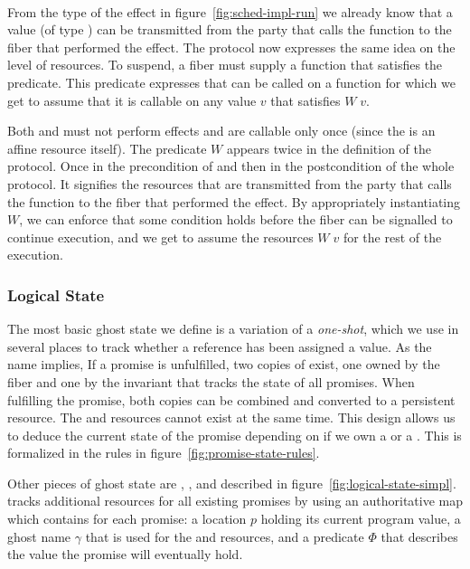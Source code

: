 \paragraph*{\esuspend{}}
From the type of the \esuspend{} effect in figure~\ref{fig:sched-impl-run} we already know that a value (of type ) can be transmitted from the party that calls the  function to the fiber that performed the effect.
The \esuspend{} protocol now expresses the same idea on the level of resources.
To suspend, a fiber must supply a function  that satisfies the \gsIsReg{} predicate.
This predicate expresses that  can be called on a  function for which we get to assume that it is callable on any value \(v\) that satisfies \(W\; v\).

Both  and  must not perform effects and are callable only once (since the \ewpt{} is an affine resource itself).
The predicate \(W\) appears twice in the definition of the protocol.
Once in the precondition of  and then in the postcondition of the whole protocol.
It signifies the resources that are transmitted from the party that calls the  function to the fiber that performed the effect.
By appropriately instantiating \(W\), we can enforce that some condition holds before the fiber can be signalled to continue execution, and we get to assume the resources \(W\; v\) for the rest of the execution.

\subsubsection{Logical State}
\label{sec:sched-spec-state}

The most basic ghost state we define is a variation of a \emph{one-shot}, which we use in several places to track whether a reference has been assigned a value.
As the name implies, 
If a promise  is unfulfilled, two copies of \gspwait{} exist, one owned by the fiber and one by the invariant that tracks the state of all promises.
When fulfilling the promise, both copies can be combined and converted to a persistent \gspdone{} resource.
The \gspwait{} and \gspdone{} resources cannot exist at the same time.
This design allows us to deduce the current state of the promise depending on if we own a \gspwait{} or a \gspdone{}.
This is formalized in the rules in figure~\ref{fig:promise-state-rules}.

Other pieces of ghost state are \gsPInvIn{}, \gsIsPr{}, and \gsReady{} described in figure~\ref{fig:logical-state-simpl}.
\gsPInvIn{} tracks additional resources for all existing promises by using an authoritative map which contains for each promise:
a location \(p\) holding its current program value,
a ghost name \(\gamma\) that is used for the \gspwait{} and \gspdone{} resources,
and a predicate \(Φ\) that describes the value the promise will eventually hold.


